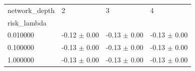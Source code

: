 \begin{tabular}{llll}
\toprule
network_depth & 2 & 3 & 4 \\
risk_lambda &  &  &  \\
\midrule
0.010000 & -0.12 $\pm$ 0.00 & -0.13 $\pm$ 0.00 & -0.13 $\pm$ 0.00 \\
0.100000 & -0.13 $\pm$ 0.00 & -0.13 $\pm$ 0.00 & -0.13 $\pm$ 0.00 \\
1.000000 & -0.13 $\pm$ 0.00 & -0.13 $\pm$ 0.00 & -0.13 $\pm$ 0.00 \\
\bottomrule
\end{tabular}

